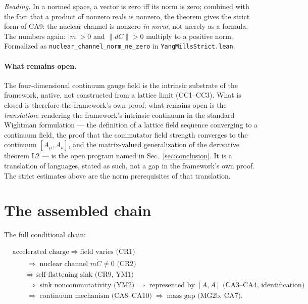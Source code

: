 \documentclass[aps,prd,preprint,superscriptaddress,amsmath,amssymb]{revtex4-2}
\begin{document}
\emph{Reading.}  In a normed space, a vector is zero iff its norm is
zero; combined with the fact that a product of nonzero reals is
nonzero, the theorem gives the strict form of CA9: the nuclear
channel is nonzero \emph{in norm}, not merely as a formula.  The
numbers again: $|m|>0$ and $\|dC\|>0$ multiply to a positive norm.
Formalized as \texttt{nuclear\_channel\_norm\_ne\_zero} in
\texttt{YangMillsStrict.lean}.

\paragraph{What remains open.}
The four-dimensional continuum gauge field is the intrinsic substrate
of the framework, native, not constructed from a lattice limit
(CC1--CC3).  What is closed is therefore the framework's own proof;
what remains open is the \emph{translation}: rendering the
framework's intrinsic continuum in the standard Wightman formulation
--- the definition of a lattice field sequence converging to a
continuum field, the proof that the commutator field strength
converges to the continuum $[A_\mu,A_\nu]$, and the matrix-valued
generalization of the derivative theorem L2 --- is the open program
named in Sec.~\ref{sec:conclusion}.  It is a translation of languages, stated as
such, not a gap in the framework's own proof.  The strict estimates
above are the norm prerequisites of that translation.

\section{The assembled chain}
\label{sec:chain}

The full conditional chain:

\begin{equation}
\begin{aligned}
&\text{accelerated charge} \;\Rightarrow\; \text{field varies (CR1)}\\
&\qquad \Rightarrow\; \text{nuclear channel } m\dot C\neq0 \text{ (CR2)}\\
&\qquad \Rightarrow\; \text{self-flattening sink (CR9, YM1)}\\
&\qquad \Rightarrow\; \text{sink noncommutativity (YM2)}
  \;\Rightarrow\; \text{represented by } [A,A] \text{ (CA3--CA4, identification)}\\
&\qquad \Rightarrow\; \text{continuum mechanism (CA8--CA10)}
  \;\Rightarrow\; \text{mass gap (MG2b, CA7)} .
\end{aligned}
\end{equation}
\end{document}

